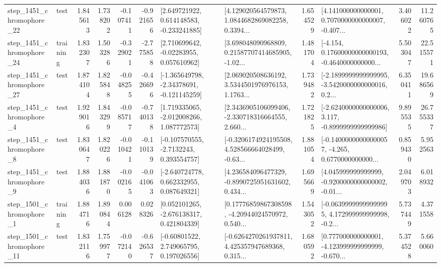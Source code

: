 \begin{tabular}{llrrrrllrlrr}
 step\_1451\_chromophore\_22 &      test &      1.845613 &    1.738202 &     -0.107411 & -0.921656 &    [2.649721922, 0.614148583, -0.233241885] &  [4.129020564579873, 1.0844682869082258, 0.3394... &       1.654529 &  [4.141000000000001, 0.7070000000000007, -0.407... &            3.406022 &         11.260765 \\
 step\_1451\_chromophore\_24 &  training &      1.832307 &    1.503286 &     -0.329021 & -2.775858 &     [2.710699642, -0.02283955, 0.057610962] &  [3.698048090968809, 0.21587707414685905, -1.02... &       1.481704 &  [-4.154, 0.17600000000000193, -0.4640000000000... &            5.503047 &         22.515571 \\
 step\_1451\_chromophore\_27 &      test &      1.874104 &    1.825848 &     -0.048255 & -0.426696 &   [-1.365649798, -2.34378691, -0.121145259] &  [2.069020508636192, 3.5344501976976153, 1.1763... &       1.739482 &  [-2.1899999999999995, -3.5420000000000016, 0.2... &            6.350411 &         19.686569 \\
  step\_1451\_chromophore\_4 &      test &      1.929016 &    1.843299 &     -0.085717 & -0.740138 &    [1.719335065, -2.012008266, 1.087772573] &  [2.3436905106099406, -2.330718316664555, 2.660... &       1.721825 &  [-2.6240000000000006, 3.117, -0.8999999999999986] &            9.895535 &         26.755337 \\
  step\_1451\_chromophore\_8 &      test &      1.830647 &    1.820226 &     -0.010421 & -0.110139 &     [-0.107570555, -2.7132243, 0.393554757] &  [-0.3206174924195508, 4.528566664028499, -0.63... &       1.881054 &  [-0.14000000000000057, -4.265, 0.6770000000000... &            0.859430 &          5.952563 \\
  step\_1451\_chromophore\_9 &      test &      1.884036 &    1.881870 &     -0.002165 & -0.041063 &    [-2.640724778, 0.662332955, 0.087649321] &  [4.236584096477329, -0.8990725951631602, 0.434... &       1.695669 &  [4.045999999999999, -0.9200000000000002, -0.01... &            2.049703 &          6.018932 \\
  step\_1501\_chromophore\_1 &  training &      1.884716 &    1.890844 &      0.006128 &  0.028326 &    [0.052101265, -2.676138317, 0.421804339] &  [0.17776859867308598, -4.20944024570972, 0.540... &       1.543052 &  [-0.06399999999999995, 4.172999999999998, -0.2... &            5.737449 &          4.371558 \\
 step\_1501\_chromophore\_11 &      test &      1.832116 &    1.759977 &     -0.072140 & -0.626537 &     [-0.60801522, 2.749065795, 0.197026556] &  [-0.6264270261937811, 4.425357947689368, 0.315... &       1.680592 &  [0.777000000000001, -4.123999999999999, -0.670... &            5.374528 &          5.660060 \\

\end{tabular}
